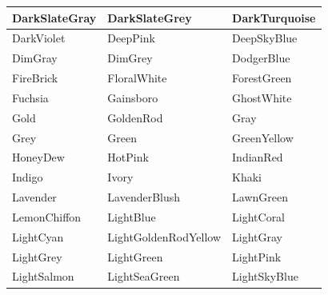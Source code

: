 \documentclass[a4paper,12pt]{article}
\begin{document}
\begin{center}
\begin{longtable}{|p{}|p{}|p{}|}
    \cellcolor[HTML]{2F4F4F} DarkSlateGray     & \cellcolor[HTML]{2F4F4F} DarkSlateGrey        & \cellcolor[HTML]{00CED1} DarkTurquoise   \\ \hline
    \cellcolor[HTML]{9400D3} DarkViolet        & \cellcolor[HTML]{FF1493} DeepPink             & \cellcolor[HTML]{00BFFF} DeepSkyBlue     \\ \hline
    \cellcolor[HTML]{696969} DimGray           & \cellcolor[HTML]{696969} DimGrey              & \cellcolor[HTML]{1E90FF} DodgerBlue      \\ \hline
    \cellcolor[HTML]{B22222} FireBrick         & \cellcolor[HTML]{FFFAF0} FloralWhite          & \cellcolor[HTML]{228B22} ForestGreen     \\ \hline
    \cellcolor[HTML]{FF00FF} Fuchsia           & \cellcolor[HTML]{DCDCDC} Gainsboro            & \cellcolor[HTML]{F8F8F8} GhostWhite      \\ \hline
    \cellcolor[HTML]{FFD700} Gold              & \cellcolor[HTML]{DAA520} GoldenRod            & \cellcolor[HTML]{808080} Gray            \\ \hline
    \cellcolor[HTML]{808080} Grey              & \cellcolor[HTML]{008000} Green                & \cellcolor[HTML]{ADFF2F} GreenYellow     \\ \hline
    \cellcolor[HTML]{F0FFF0} HoneyDew          & \cellcolor[HTML]{FF69B4} HotPink              & \cellcolor[HTML]{CD5C5C} IndianRed       \\ \hline
    \cellcolor[HTML]{4B0082} Indigo            & \cellcolor[HTML]{FFFFF0} Ivory                & \cellcolor[HTML]{F0E68C} Khaki           \\ \hline
    \cellcolor[HTML]{E6E6FA} Lavender          & \cellcolor[HTML]{FFF0F5} LavenderBlush        & \cellcolor[HTML]{7CFC00} LawnGreen       \\ \hline
    \cellcolor[HTML]{FFFACD} LemonChiffon      & \cellcolor[HTML]{ADD8E6} LightBlue            & \cellcolor[HTML]{F08080} LightCoral      \\ \hline
    \cellcolor[HTML]{E0FFFF} LightCyan         & \cellcolor[HTML]{FAFAD2} LightGoldenRodYellow & \cellcolor[HTML]{D3D3D3} LightGray       \\ \hline
    \cellcolor[HTML]{D3D3D3} LightGrey         & \cellcolor[HTML]{90EE90} LightGreen           & \cellcolor[HTML]{FFB6C1} LightPink       \\ \hline
    \cellcolor[HTML]{FFA07A} LightSalmon       & \cellcolor[HTML]{20B2AA} LightSeaGreen        & \cellcolor[HTML]{87CEFA} LightSkyBlue    \\ \hline

\end{longtable}
\end{center}
\end{document}
